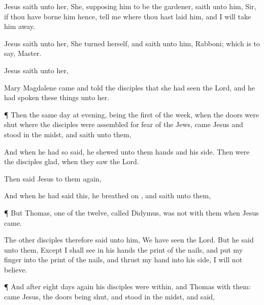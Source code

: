 {Jesus
saith unto
her,
{}
She,
supposing
him to
be the
gardener,
saith unto
him,
Sir,
if
thou have
borne
him
hence,
tell
me
where thou hast
laid
him, and
I will
take
him
away.

Jesus
saith unto
her,
{} She turned
herself, and
saith unto
him,
Rabboni;
which is to
say,
Master.

Jesus
saith unto
her,
{}

Mary
Magdalene
came and
told the
disciples
that she had
seen the
Lord,
and
{} he had
spoken these
things unto
her.


\par }{\PP {}¶
Then the
same
day at
evening,
being the
first
{} of the
week,
when the
doors were
shut
where the
disciples
were
assembled
for
fear of the
Jews,
came
Jesus
and
stood
in the
midst,
and
saith unto
them,
{}

And when he
had
so
said, he
shewed unto
them
{}
hands
and
his
side.
Then
were the
disciples
glad, when they
saw the
Lord.

Then
said
Jesus to
them
again,
{}

And when he had
said
this, he breathed
on
{},
and
saith unto
them,
{}



\par }{\PP {}¶
But
Thomas,
one
of the
twelve,
called
Didymus,
was
not
with
them
when
Jesus
came.

The
other
disciples
therefore
said unto
him, We have
seen the
Lord.
But he
said unto
them,
Except I shall
see
in
his
hands the
print of the
nails,
and
put
my
finger
into the
print of the
nails,
and
thrust
my
hand
into
his
side, I
will
not
believe.


\par }{\PP {}¶
And
after
eight
days
again
his
disciples
were
within,
and
Thomas
with
them:
{}
came
Jesus, the
doors being
shut,
and
stood
in the
midst,
and
said,
{}

}
